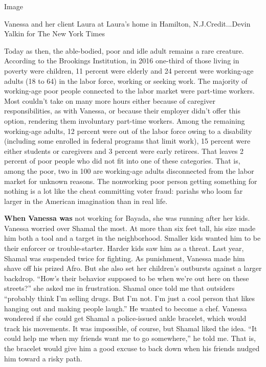 Image

Vanessa and her client Laura at Laura's home in Hamilton,
N.J.Credit...Devin Yalkin for The New York Times

Today as then, the able-bodied, poor and idle adult remains a rare
creature. According to the Brookings Institution, in 2016 one-third of
those living in poverty were children, 11 percent were elderly and 24
percent were working-age adults (18 to 64) in the labor force, working
or seeking work. The majority of working-age poor people connected to
the labor market were part-time workers. Most couldn't take on many more
hours either because of caregiver responsibilities, as with Vanessa, or
because their employer didn't offer this option, rendering them
involuntary part-time workers. Among the remaining working-age adults,
12 percent were out of the labor force owing to a disability (including
some enrolled in federal programs that limit work), 15 percent were
either students or caregivers and 3 percent were early retirees. That
leaves 2 percent of poor people who did not fit into one of these
categories. That is, among the poor, two in 100 are working-age adults
disconnected from the labor market for unknown reasons. The nonworking
poor person getting something for nothing is a lot like the cheat
committing voter fraud: pariahs who loom far larger in the American
imagination than in real life.

\textbf{When Vanessa was} not working for Bayada, she was running after
her kids. Vanessa worried over Shamal the most. At more than six feet
tall, his size made him both a tool and a target in the neighborhood.
Smaller kids wanted him to be their enforcer or trouble-starter. Harder
kids saw him as a threat. Last year, Shamal was suspended twice for
fighting. As punishment, Vanessa made him shave off his prized Afro. But
she also set her children's outbursts against a larger backdrop. ``How's
their behavior supposed to be when we're out here on these streets?''
she asked me in frustration. Shamal once told me that outsiders
``probably think I'm selling drugs. But I'm not. I'm just a cool person
that likes hanging out and making people laugh.'' He wanted to become a
chef. Vanessa wondered if she could get Shamal a police-issued ankle
bracelet, which would track his movements. It was impossible, of course,
but Shamal liked the idea. ``It could help me when my friends want me to
go somewhere,'' he told me. That is, the bracelet would give him a good
excuse to back down when his friends nudged him toward a risky path.


